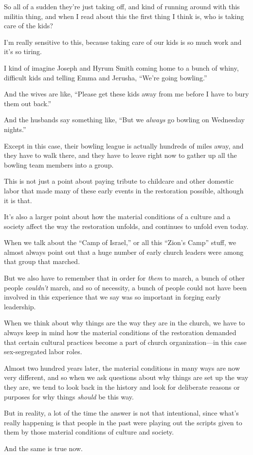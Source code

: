 \begin{compactitem}
			\item So all of a sudden they're just taking off, and kind of running around with this militia thing, and when I read about this the first thing I think is, who is taking care of the kids?
				\begin{compactitem}
					\item I'm really sensitive to this, because taking care of our kids is so much work and it's so tiring.
					\item I kind of imagine Joseph and Hyrum Smith coming home to a bunch of whiny, difficult kids and telling Emma and Jerusha, ``We're going bowling.''
					\item And the wives are like, ``Please get these kids away from me before I have to bury them out back.''
					\item And the husbands say something like, ``But we \textit{always} go bowling on Wednesday nights.''
					\item Except in this case, their bowling league is actually hundreds of miles away, and they have to walk there, and they have to leave right now to gather up all the bowling team members into a group.
					\item This is not just a point about paying tribute to childcare and other domestic labor that made many of these early events in the restoration possible, although it is that.
					\item It's also a larger point about how the material conditions of a culture and a society affect the way the restoration unfolds, and continues to unfold even today.
					\item When we talk about the ``Camp of Israel,'' or all this ``Zion's Camp'' stuff, we almost always point out that a huge number of early church leaders were among that group that marched. 
					\item But we also have to remember that in order for \textit{them} to march, a bunch of other people \textit{couldn't} march, and so of necessity, a bunch of people could not have been involved in this experience that we say was so important in forging early leadership.
					\item When we think about why things are the way they are in the church, we have to always keep in mind how the material conditions of the restoration demanded that certain cultural practices become a part of church organization---in this case sex-segregated labor roles.
					\item Almost two hundred years later, the material conditions in many ways are now very different, and so when we ask questions about why things are set up the way they are, we tend to look back in the history and look for deliberate reasons or purposes for why things \textit{should} be this way.
					\item But in reality, a lot of the time the answer is not that intentional, since what's really happening is that people in the past were playing out the scripts given to them by those material conditions of culture and society.
					\item And the same is true now.
				\end{compactitem}
				

\end{compactitem}
